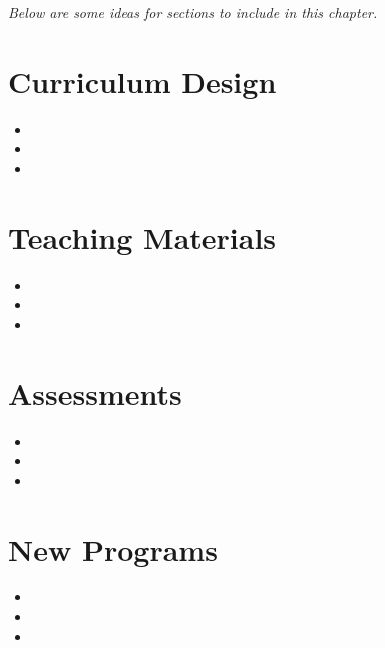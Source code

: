 \documentclass[11pt]{report}
\begin{document}
\begin{internalonly}

\textit{Below are some ideas for sections to include in this chapter.}

\section{Curriculum Design}

\begin{itemize}
\item \lipsum[1]
\item \lipsum[2]
\item \lipsum[3]
\end{itemize}

\section{Teaching Materials}

\begin{itemize}
\item \lipsum[1]
\item \lipsum[2]
\item \lipsum[3]
\end{itemize}

\section{Assessments}

\begin{itemize}
\item \lipsum[1]
\item \lipsum[2]
\item \lipsum[3]
\end{itemize}


\section{New Programs}

\begin{itemize}
\item \lipsum[1]
\item \lipsum[2]
\item \lipsum[3]
\end{itemize}

\end{internalonly}


\end{document}
